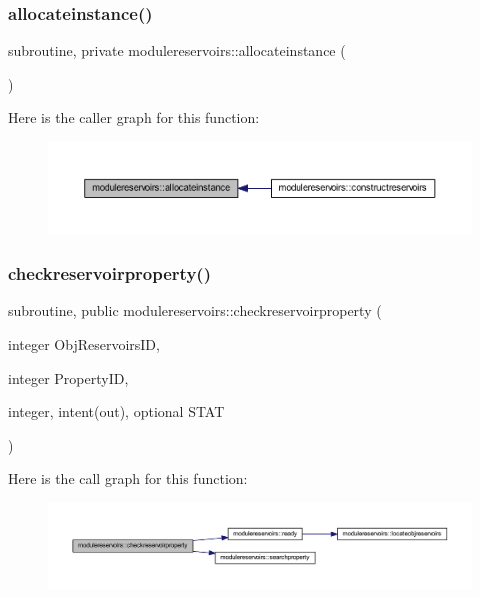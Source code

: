 \subsubsection{\texorpdfstring{allocateinstance()}{allocateinstance()}}
{\footnotesize\ttfamily subroutine, private modulereservoirs\+::allocateinstance (\begin{DoxyParamCaption}{ }\end{DoxyParamCaption})\hspace{0.3cm}{\ttfamily [private]}}

Here is the caller graph for this function\+:\nopagebreak
\begin{figure}[H]
\begin{center}
\leavevmode
\includegraphics[width=350pt]{namespacemodulereservoirs_a3bbdfd18a9b8de49cb39c9c2e60824f5_icgraph}
\end{center}
\end{figure}
\mbox{\label{namespacemodulereservoirs_ae639ba85f34ad23b758837c7842e91ed}} 
\subsubsection{\texorpdfstring{checkreservoirproperty()}{checkreservoirproperty()}}
{\footnotesize\ttfamily subroutine, public modulereservoirs\+::checkreservoirproperty (\begin{DoxyParamCaption}\item[{integer}]{Obj\+Reservoirs\+ID,  }\item[{integer}]{Property\+ID,  }\item[{integer, intent(out), optional}]{S\+T\+AT }\end{DoxyParamCaption})}

Here is the call graph for this function\+:\nopagebreak
\begin{figure}[H]
\begin{center}
\leavevmode
\includegraphics[width=350pt]{namespacemodulereservoirs_ae639ba85f34ad23b758837c7842e91ed_cgraph}
\end{center}
\end{figure}
\mbox{\label{namespacemodulereservoirs_af226bfc3156ffdd375d5b81401036b46}} 

